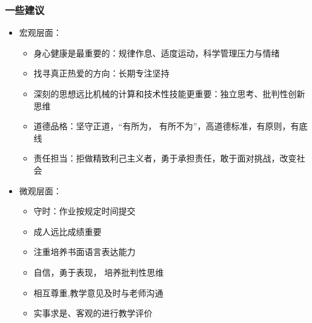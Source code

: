 \documentclass[Prob-All.tex]{subfiles}
\begin{document}
\begin{frame}
	\frametitle{一些建议}
	\begin{itemize}[<+-|alert@+>]
	    \item 宏观层面：
		\begin{itemize}[<+-|alert@+>]

		\item 身心健康是最重要的：规律作息、适度运动，科学管理压力与情绪
		\item 找寻真正热爱的方向：长期专注坚持
		\item 深刻的思想远比机械的计算和技术性技能更重要：独立思考、批判性创新思维
		\item 道德品格：坚守正道，“有所为， 有所不为”，高道德标准，有原则，有底线

		\item 责任担当：拒做精致利己主义者，勇于承担责任，敢于面对挑战，改变社会
		\end{itemize}
\item 微观层面：
		\begin{itemize}[<+-|alert@+>]

		\item 守时：作业按规定时间提交
		\item 成人远比成绩重要
		\item 注重培养书面语言表达能力
		\item  自信，勇于表现， 培养批判性思维
		\item 相互尊重,教学意见及时与老师沟通
		\item 实事求是、客观的进行教学评价
		\end{itemize}


	\end{itemize}
\end{frame}



\end{document}
